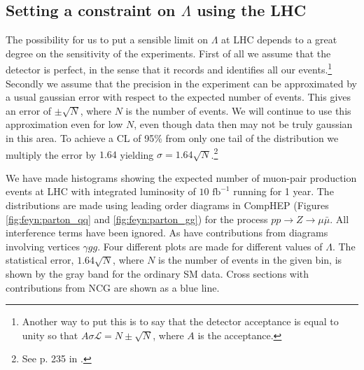 \subsection{Setting a constraint on $\Lambda$ using the LHC}
The possibility for us to put a sensible limit on $\Lambda$ at LHC depends to a great degree on the sensitivity of the experiments. First of all we assume that the detector is perfect, in the sense that it records and identifies all our events.\footnote{Another way to put this is to say that the detector acceptance is equal to unity so that $A\sigma \mathcal{L} = N \pm \sqrt{N}$, where $A$ is the acceptance.} Secondly we assume that the precision in the experiment can be approximated by a usual gaussian error with respect to the expected number of events. This gives an error of $\pm \sqrt{N}$, where $N$ is the number of events. We will continue to use this approximation even for low $N$, even though data then may not be truly gaussian in this area. To achieve a CL of 95\% from only one tail of the distribution we multiply the error by $1.64$ yielding $\sigma = 1.64 \sqrt{N}$.\footnote{See p. 235 in \cite{hagiwara2002rpp}.}

We have made histograms showing the expected number of muon-pair production events at LHC with integrated luminosity of $10 \textrm{ fb}^{-1}$ running for 1 year. The distributions are made using leading order diagrams in CompHEP (Figures \ref{fig:feyn:parton_qq} and \ref{fig:feyn:parton_gg}) for the process $pp \rightarrow Z \rightarrow \mu \bar \mu$. All interference terms have been ignored. As have contributions from diagrams involving vertices $\gamma gg$. Four different plots are made for different values of $\Lambda$. The statistical error, $1.64\sqrt{N}$, where $N$ is the number of events in the given bin, is shown by the gray band for the ordinary SM data. Cross sections with contributions from NCG are shown as a blue line.

